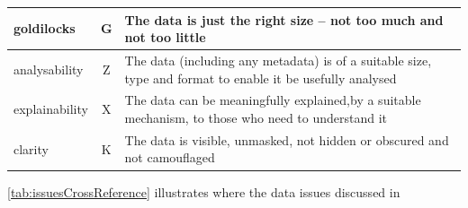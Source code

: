 \begin{longtable}{|L{}|C{}|L{}|}
	{\Gls{goldilocks}} & G & {The data is just the right size -- not too much and not too little}\\\hline
	{\Gls{analysability}} & Z & {The data (including any \gls{metadata}) is of a suitable size, type and format to enable it be usefully analysed}\\\hline
	{\Gls{explainability}} & X & {The data can be meaningfully explained,by a suitable mechanism, to those who need to understand it}\\\hline
	{\Gls{clarity}} & K & {The data is visible, unmasked, not hidden or obscured and not camouflaged}\\\hline
\end{longtable}

\autoref{tab:issuesCrossReference} illustrates where the data issues discussed in 

